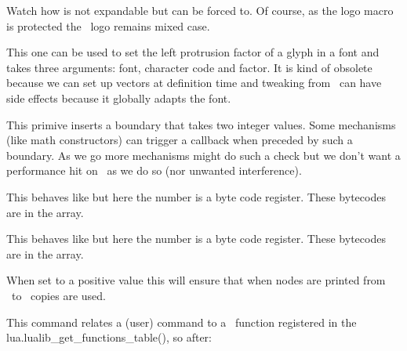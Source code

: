 \typebuffer

Watch how  is not expandable but can be forced to. Of course, as
the logo macro is protected the \TEX\ logo remains mixed case.

\startlines
\getbuffer
\stoplines

\stopoldprimitive

\startnewprimitive[title={\prm {lpcode}}]

This one can be used to set the left protrusion factor of a glyph in a font and
takes three arguments: font, character code and factor. It is kind of obsolete
because we can set up vectors at definition time and tweaking from \TEX\ can have
side effects because it globally adapts the font.

\stopnewprimitive

\startnewprimitive[title={\prm {luaboundary}}]

This primive inserts a boundary that takes two integer values. Some mechanisms
(like math constructors) can trigger a callback when preceded by such a boundary.
As we go more mechanisms might do such a check but we don't want a performance
hit on \CONTEXT\ as we do so (nor unwanted interference).

\stopnewprimitive

\startnewprimitive[title={\prm {luabytecode}}]

This behaves like  but here the number is a byte code register.
These bytecodes are in the  array.

\stopnewprimitive

\startnewprimitive[title={\prm {luabytecodecall}}]

This behaves like  but here the number is a byte code
register. These bytecodes are in the  array.

\stopnewprimitive

\startnewprimitive[title={\prm {luacopyinputnodes}}]

When set to a positive value this will ensure that when nodes are printed from
\LUA\ to \TEX\ copies are used.

\stopnewprimitive

\startnewprimitive[title={\prm {luadef}}]


This command relates a (user) command to a \LUA\ function registered in the \typ
{lua.lualib_get_functions_table()}, so after:

